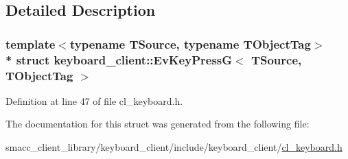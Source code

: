 \subsection{Detailed Description}
\subsubsection*{template$<$typename T\+Source, typename T\+Object\+Tag$>$\\*
struct keyboard\+\_\+client\+::\+Ev\+Key\+Press\+G$<$ T\+Source, T\+Object\+Tag $>$}



Definition at line 47 of file cl\+\_\+keyboard.\+h.



The documentation for this struct was generated from the following file\+:\begin{DoxyCompactItemize}
\item 
smacc\+\_\+client\+\_\+library/keyboard\+\_\+client/include/keyboard\+\_\+client/\hyperlink{cl__keyboard_8h}{cl\+\_\+keyboard.\+h}\end{DoxyCompactItemize}
